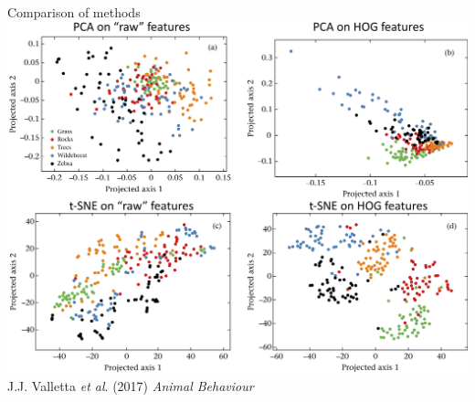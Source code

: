 \documentclass[pdf]{beamer}
\begin{document}
\begin{frame}{Comparison of methods}
\centering
\includegraphics[width=.75\textwidth]{03-comparison.png}
\vfill
{\tiny J.J. Valletta \textit{et al}. (2017) \textit{Animal Behaviour}}
\end{frame}


\end{document}

